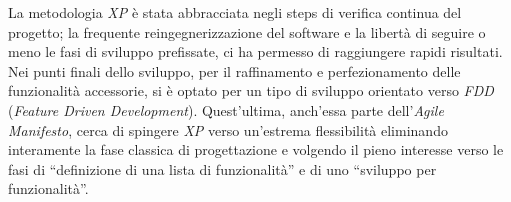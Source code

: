La metodologia \textit{XP} è stata abbracciata negli steps di verifica continua del progetto; la frequente reingegnerizzazione del software e la libertà di seguire o meno le fasi di sviluppo prefissate, ci ha permesso di raggiungere rapidi risultati. Nei punti finali dello sviluppo, per il raffinamento e perfezionamento delle funzionalità accessorie, si è optato per un tipo di sviluppo orientato verso \textit{FDD} (\textit{Feature Driven Development}).
Quest'ultima, anch'essa parte dell'\textit{Agile Manifesto}, cerca di spingere \textit{XP} verso un'estrema flessibilità eliminando interamente la fase classica di progettazione e volgendo il pieno interesse verso le fasi di ``definizione di una lista di funzionalità'' e di uno ``sviluppo per funzionalità''.
